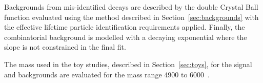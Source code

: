 Backgrounds from mis-identified \bhh decays are described by the double Crystal Ball function evaluated using the method described in Section~\ref{sec:backgrounds} with the effective lifetime particle identification requirements applied. Finally, the combinatorial background is modelled with a decaying exponential where the slope is not constrained in the final fit.

The mass \pdfs used in the toy studies, described in Section~\ref{sec:toys}, for the signal and backgrounds are evaluated for the mass range 4900 to 6000~\mevcc. %


